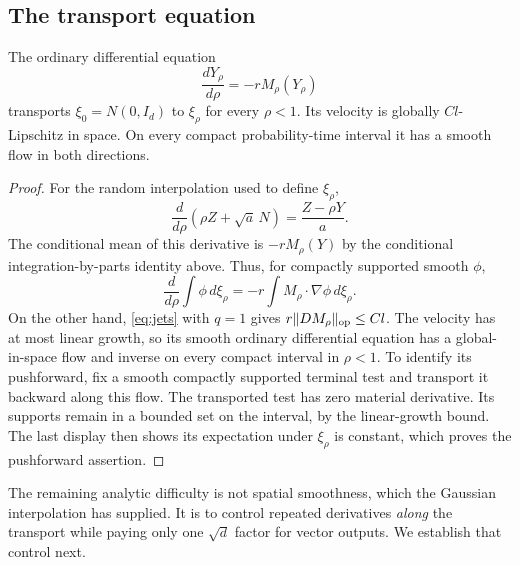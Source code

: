 \subsection{The transport equation}

\begin{proposition}
\label{prop:transport}
The ordinary differential equation
\begin{equation}
 \frac{dY_\rho}{d\rho}=-rM_\rho(Y_\rho)
 \label{eq:transport}
\end{equation}
transports $\xi_0=N(0,I_d)$ to $\xi_\rho$ for every $\rho<1$.
Its velocity is globally $Cl$-Lipschitz in space.  On every compact
probability-time interval it has a smooth flow in both directions.
\end{proposition}

\begin{proof}
For the random interpolation used to define $\xi_\rho$,
\[
 \frac{d}{d\rho}(\rho Z+\sqrt a\,N)
 =\frac{Z-\rho Y}{a}.
\]
The conditional mean of this derivative is $-rM_\rho(Y)$ by the
conditional integration-by-parts identity above.  Thus, for compactly
supported smooth $\phi$,
\[
 \frac{d}{d\rho}\int\phi\,d\xi_\rho
 =-r\int M_\rho\cdot\nabla\phi\,d\xi_\rho.
\]
On the other hand, \eqref{eq:jets} with $q=1$ gives
$r\|DM_\rho\|_{\mathrm{op}}\le Cl$.  The velocity has at most linear growth,
so its smooth ordinary differential equation has a global-in-space
flow and inverse on every compact interval in $\rho<1$.
To identify its pushforward, fix a smooth compactly supported terminal
test and transport it backward along this flow.  The transported test
has zero material derivative.  Its supports remain in a bounded set
on the interval, by the linear-growth bound.  The last display then
shows its expectation under $\xi_\rho$ is constant, which proves the
pushforward assertion.
\end{proof}

The remaining analytic difficulty is not spatial smoothness, which the
Gaussian interpolation has supplied.  It is to control repeated
derivatives \emph{along} the transport while paying only one
$\sqrt d$ factor for vector outputs.  We establish that control next.

